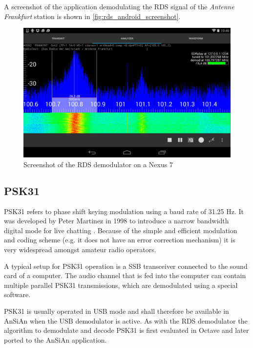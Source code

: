 A screenshot of the application demodulating the \ac{RDS} signal of the
\emph{Antenne Frankfurt} station is shown in \autoref{fig:rds_android_screenshot}.

\begin{figure}
	\centering
	\includegraphics[width=1\linewidth]{gfx/rds/android_screenshot.png}
	\caption{Screenshot of the RDS demodulator on a Nexus 7}
	\label{fig:rds_android_screenshot}
\end{figure}


\subsection{PSK31\label{sec:psk31}}

\ac{PSK31} refers to phase shift keying modulation using a baud rate of 31.25
Hz.  It was developed by Peter Martinez in 1998 to introduce a narrow bandwidth
digital mode for live chatting \cite{martinez1998psk31}. Because of the simple and efficient modulation
and coding scheme (e.g. it does not have an error correction mechanism) it is
very widespread amongst amateur radio operators.

A typical setup for \ac{PSK31} operation is a \ac{SSB} transceiver connected
to the sound card of a computer. The audio channel that is fed into the computer
can contain multiple parallel \ac{PSK31} transmissions, which are demodulated
using a special software.

PSK31 is usually operated in \ac{USB} mode and shall therefore be available
in \ac{AnSiAn} when the \ac{USB} demodulator is active.
As with the \ac{RDS} demodulator the algorithm to demodulate and decode \ac{PSK31}
is first evaluated in Octave and later ported to the \ac{AnSiAn} application.

